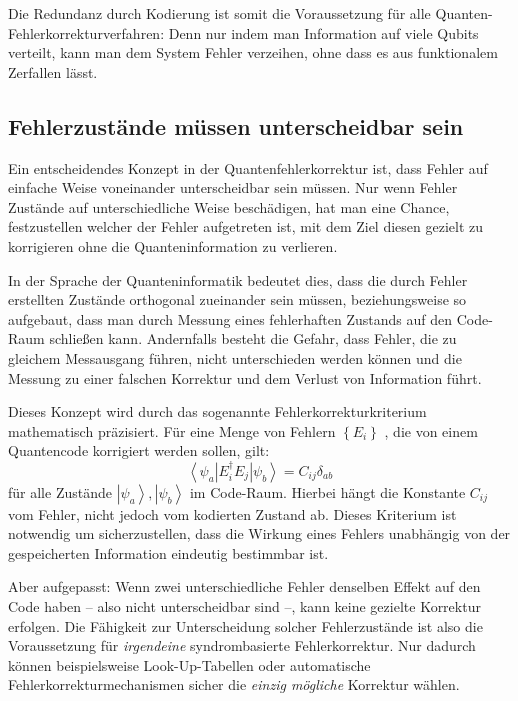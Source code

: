 Die Redundanz durch Kodierung ist somit die Voraussetzung für alle Quanten-Fehlerkorrekturverfahren: Denn nur indem man Information auf viele Qubits verteilt, kann man dem System Fehler \(\)verzeihen, ohne dass es aus funktionalem Zerfallen lässt.

\subsection{Fehlerzustände müssen unterscheidbar sein}
Ein entscheidendes Konzept in der Quantenfehlerkorrektur ist, dass Fehler auf einfache Weise voneinander unterscheidbar sein müssen. Nur wenn Fehler Zustände auf unterschiedliche Weise beschädigen, hat man eine Chance, festzustellen welcher der Fehler aufgetreten ist, mit dem Ziel diesen gezielt zu korrigieren ohne die Quanteninformation zu verlieren.

In der Sprache der Quanteninformatik bedeutet dies, dass die durch Fehler erstellten Zustände orthogonal zueinander sein müssen, beziehungsweise so aufgebaut, dass man durch Messung eines fehlerhaften Zustands auf den Code-Raum schließen kann. Andernfalls besteht die Gefahr, dass Fehler, die zu gleichem Messausgang führen, nicht unterschieden werden können und die Messung zu einer falschen Korrektur und dem Verlust von Information führt. \cite[Seite 449–451]{nielsen_michael_a_and_isaac_l_chuang_quantum_2010}

Dieses Konzept wird durch das sogenannte Fehlerkorrekturkriterium mathematisch präzisiert. Für eine Menge von Fehlern \(\left\{E_{i}\right\}\) , die von einem Quantencode korrigiert werden sollen, gilt:
\begin{equation}
    \left\langle\psi_{a}\right| E_{i}^{\dagger} E_{j}\left|\psi_{b}\right\rangle=C_{i j} \delta_{a b}
\end{equation}
für alle Zustände \(
    \left|\psi_{a}\right\rangle,\left|\psi_{b}\right\rangle
\)  im Code-Raum. Hierbei hängt die Konstante \(
    C_{i j}
\) vom Fehler,  nicht jedoch vom kodierten Zustand ab. Dieses Kriterium ist notwendig um sicherzustellen, dass die Wirkung eines Fehlers unabhängig von der gespeicherten Information eindeutig bestimmbar ist.

Aber aufgepasst: Wenn zwei unterschiedliche Fehler denselben Effekt auf den Code haben – also nicht unterscheidbar sind –, kann keine gezielte Korrektur erfolgen. Die Fähigkeit zur Unterscheidung solcher Fehlerzustände ist also die Voraussetzung für \textit{irgendeine} syndrombasierte Fehlerkorrektur. Nur dadurch können beispielsweise Look-Up-Tabellen oder automatische Fehlerkorrekturmechanismen sicher die \textit{einzig mögliche} Korrektur wählen.

